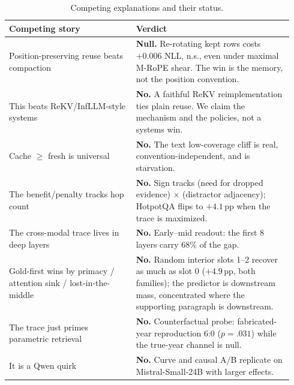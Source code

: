 \documentclass[11pt]{article}
\newcommand{\pp}{\,\mathrm{pp}}
\begin{document}
\begin{table}[h]
\centering
\small
\caption{Competing explanations and their status.}
\label{tab:ruledout}
\begin{tabular}{p{0.42\linewidth}p{0.52\linewidth}}
\toprule
Competing story & Verdict \\
\midrule
Position-preserving reuse beats compaction & \textbf{Null.} Re-rotating kept rows costs $+0.006$ NLL, n.s., even under maximal M-RoPE shear. The win is the memory, not the position convention. \\
This beats ReKV/InfLLM-style systems & \textbf{No.} A faithful ReKV reimplementation ties plain reuse. We claim the mechanism and the policies, not a systems win. \\
Cache $\geq$ fresh is universal & \textbf{No.} The text low-coverage cliff is real, convention-independent, and is starvation. \\
The benefit/penalty tracks hop count & \textbf{No.} Sign tracks (need for dropped evidence) $\times$ (distractor adjacency); HotpotQA flips to $+4.1\pp$ when the trace is maximized. \\
The cross-modal trace lives in deep layers & \textbf{No.} Early--mid readout: the first 8 layers carry $68\%$ of the gap. \\
Gold-first wins by primacy / attention sink / lost-in-the-middle & \textbf{No.} Random interior slots 1--2 recover as much as slot 0 ($+4.9\pp$, both families); the predictor is downstream mass, concentrated where the supporting paragraph is downstream. \\
The trace just primes parametric retrieval & \textbf{No.} Counterfactual probe: fabricated-year reproduction 6:0 ($p{=}.031$) while the true-year channel is null. \\
It is a Qwen quirk & \textbf{No.} Curve and causal A/B replicate on Mistral-Small-24B with larger effects. \\
\bottomrule
\end{tabular}
\end{table}
\end{document}
